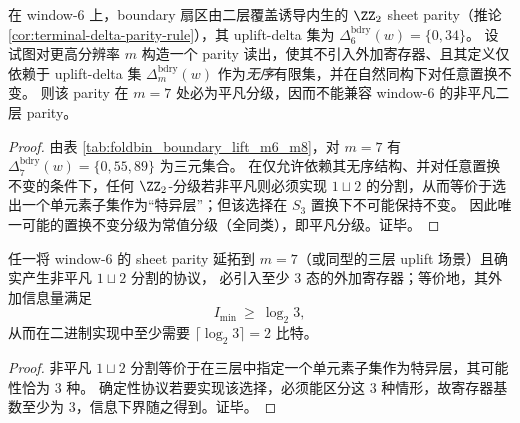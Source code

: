 \begin{proposition}\label{prop:bdry-sheet-parity-extension-obstruction-m7}
在 window-\(6\) 上，boundary 扇区由二层覆盖诱导内生的 \(\ZZ_2\) sheet parity（推论 \ref{cor:terminal-delta-parity-rule}），其 uplift-delta 集为 \(\Delta^{\mathrm{bdry}}_6(w)=\{0,34\}\)。
设试图对更高分辨率 \(m\) 构造一个 parity 读出，使其不引入外加寄存器、且其定义仅依赖于 uplift-delta 集 \(\Delta^{\mathrm{bdry}}_m(w)\) 作为\emph{无序}有限集，并在自然同构下对任意置换不变。
则该 parity 在 \(m=7\) 处必为平凡分级，因而不能兼容 window-\(6\) 的非平凡二层 parity。
\end{proposition}
\begin{proof}
由表 \ref{tab:foldbin_boundary_lift_m6_m8}，对 \(m=7\) 有 \(\Delta^{\mathrm{bdry}}_7(w)=\{0,55,89\}\) 为三元集合。
在仅允许依赖其无序结构、并对任意置换不变的条件下，任何 \(\ZZ_2\)-分级若非平凡则必须实现 \(1\sqcup 2\) 的分割，从而等价于选出一个单元素子集作为“特异层”；但该选择在 \(S_3\) 置换下不可能保持不变。
因此唯一可能的置换不变分级为常值分级（全同类），即平凡分级。证毕。
\end{proof}

\begin{corollary}\label{cor:bdry-sheet-parity-extension-min-register}
任一将 window-\(6\) 的 sheet parity 延拓到 \(m=7\)（或同型的三层 uplift 场景）且确实产生非平凡 \(1\sqcup 2\) 分割的协议，
必引入至少 \(3\) 态的外加寄存器；等价地，其外加信息量满足
\[
I_{\min}\ \ge\ \log_2 3,
\]
从而在二进制实现中至少需要 \(\lceil \log_2 3\rceil=2\) 比特。
\end{corollary}
\begin{proof}
非平凡 \(1\sqcup 2\) 分割等价于在三层中指定一个单元素子集作为特异层，其可能性恰为 \(3\) 种。
确定性协议若要实现该选择，必须能区分这 \(3\) 种情形，故寄存器基数至少为 \(3\)，信息下界随之得到。证毕。
\end{proof}





